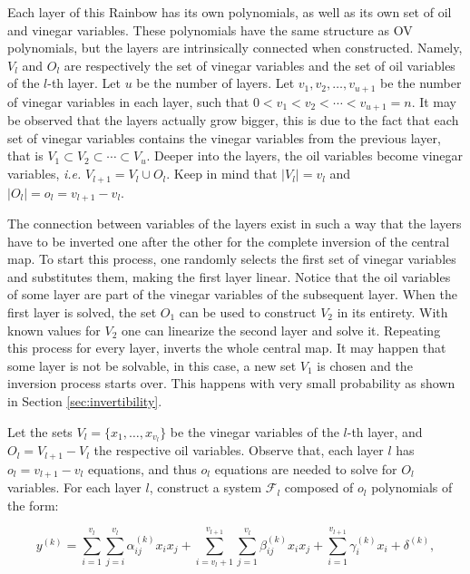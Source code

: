 \documentclass{ufsctex/ufsctex}
\begin{document}
Each layer of this Rainbow has its own polynomials, as well as its own set of
oil and vinegar variables. These polynomials have the same structure as OV
polynomials, but the layers are intrinsically connected when constructed.
Namely, $V_l$ and $O_l$ are respectively the set of vinegar variables and the
set of oil variables of the $l$-th layer. Let $u$ be the number of layers. Let
$v_1, v_2, \dots, v_{u+1}$ be the number of vinegar variables in each layer,
such that $0 < v_1 < v_2 < \cdots < v_{u+1} = n$. It may be observed that the
layers actually grow bigger, this is due to the fact that each set of vinegar
variables contains the vinegar variables from the previous layer, that is $V_1
\subset V_2 \subset \cdots \subset V_{u}$. Deeper into the layers, the oil
variables become vinegar variables, \textit{i.e.} $V_{l+1} = V_l \cup O_l$.
Keep in mind that $|V_l| = v_l$ and $|O_l| = o_l = v_{l+1} - v_{l}$.

The connection between variables of the layers exist in such a way that the
layers have to be inverted one after the other for the complete inversion of
the central map. To start this process, one randomly selects the first set of
vinegar variables and substitutes them, making the first layer linear. Notice
that the oil variables of some layer are part of the vinegar variables of the
subsequent layer. When the first layer is solved, the set $O_1$ can be used to
construct $V_2$ in its entirety. With known values for $V_2$ one can linearize
the second layer and solve it. Repeating this process for every layer, inverts
the whole central map. It may happen that some layer is not be solvable, in
this case, a new set $V_1$ is chosen and the inversion process starts over.
This happens with very small probability as shown in Section
\ref{sec:invertibility}.

Let the sets $V_l = \{x_1, \dots, x_{v_l}\}$ be the vinegar variables of the
$l$-th layer, and $O_l = V_{l+1} - V_l$ the respective oil variables. Observe
that, each layer $l$ has $o_l = v_{l+1} - v_{l}$ equations, and thus $o_l$
equations are needed to solve for $O_l$ variables. For each layer $l$,
construct a system $\mathcal{F}_l$ composed of $o_l$ polynomials of the form:

\begin{equation}\label{eq:rainbowmap}
y^{(k)} =
\sum_{i=1}^{v_l}\sum_{j=i}^{v_l} \alpha^{(k)}_{ij} x_i x_j +
\sum_{i=v_l+1}^{v_{l+1}}\sum_{j=1}^{v_l} \beta^{(k)}_{ij} x_i x_j +
\sum_{i=1}^{v_{l+1}} \gamma^{(k)}_{i} x_i +
\delta^{(k)},
\end{equation}
\end{document}
